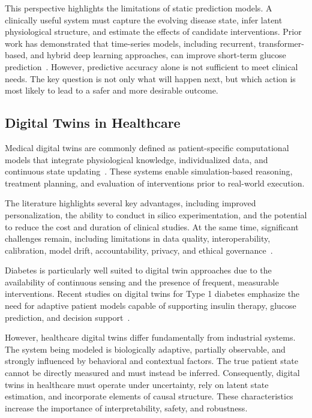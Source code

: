 \documentclass[journal]{IEEEtran}
\begin{document}
This perspective highlights the limitations of static prediction models. A clinically useful system must capture the evolving disease state, infer latent physiological structure, and estimate the effects of candidate interventions. Prior work has demonstrated that time-series models, including recurrent, transformer-based, and hybrid deep learning approaches, can improve short-term glucose prediction~\cite{ref9,ref10,ref23,ref24,ref25,ref30,ref31,ref32}. However, predictive accuracy alone is not sufficient to meet clinical needs. The key question is not only what will happen next, but which action is most likely to lead to a safer and more desirable outcome.

\subsection{Digital Twins in Healthcare}
Medical digital twins are commonly defined as patient-specific computational models that integrate physiological knowledge, individualized data, and continuous state updating~\cite{ref4,ref5,ref6,ref7,ref8,ref20,ref21,ref22,ref26}. These systems enable simulation-based reasoning, treatment planning, and evaluation of interventions prior to real-world execution.

The literature highlights several key advantages, including improved personalization, the ability to conduct in silico experimentation, and the potential to reduce the cost and duration of clinical studies. At the same time, significant challenges remain, including limitations in data quality, interoperability, calibration, model drift, accountability, privacy, and ethical governance~\cite{ref7,ref8,ref13,ref21,ref22,ref26}.

Diabetes is particularly well suited to digital twin approaches due to the availability of continuous sensing and the presence of frequent, measurable interventions. Recent studies on digital twins for Type 1 diabetes emphasize the need for adaptive patient models capable of supporting insulin therapy, glucose prediction, and decision support~\cite{ref4}.

However, healthcare digital twins differ fundamentally from industrial systems. The system being modeled is biologically adaptive, partially observable, and strongly influenced by behavioral and contextual factors. The true patient state cannot be directly measured and must instead be inferred. Consequently, digital twins in healthcare must operate under uncertainty, rely on latent state estimation, and incorporate elements of causal structure. These characteristics increase the importance of interpretability, safety, and robustness.
\end{document}
